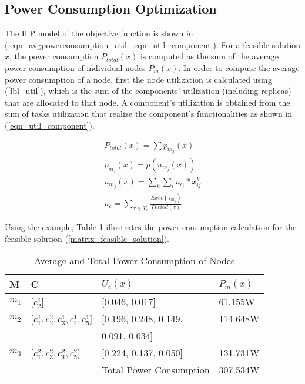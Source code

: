 \subsection{Power Consumption Optimization }
The ILP model of the objective function is shown in (\ref{eqn_avgpowerconsumption_util}-\ref{eqn_util_component}). For a feasible solution $x$, the power consumption $P_{total}(x)$ is computed as the sum of the average power consumption of individual nodes $P_m(x)$. In order to compute the average power consumption of a node, first the node utilization is calculated using (\ref{lbl_util}), which is the sum of the components' utilization (including replicas) that are allocated to that node. A component's utilization is obtained from the sum of tasks utilization that realize the component's functionalities as shown in (\ref{eqn_util_component}).

\begin{align}
\label{eqn_avgpowerconsumption_util}
P_{total}(x) = \sum{p_{m_j}(x)}\\
\label{lbl_power}
p_{m_j}(x) = p(u_{m_j}{(x)})\\
\label{lbl_util}
u_{m_j}{(x)} = \sum_k{\sum_i{u_{c_i}*x^k_{ij}}}\\
\label{eqn_util_component}
u_c = \sum_{\tau\in T_{c}} \frac{Exec(\tau_{m_j})}{Period(\tau)}
\end{align}

Using the example, Table \ref{tbl_powerconsumption} illustrates the power consumption calculation for the feasible solution (\ref{matrix_feasible_solution}).


\begin{table}[h]
\linespread{1.0}\small
\centering
\begin{tabular}{@{}llll@{}}
\toprule
M  & C                             					& $U_c (x)$                                    & $P_m (x)$      \\ \midrule
$m_1$ & {[}$c^1_2${]}                     			& {[}0.046, 0.017{]}                       & 61.155W  \\[0.3em]
$m_2$ & {[}$c^1_1, c^2_2, c^1_3, c^1_4, c^1_5${]} 	& {[}0.196, 0.248, 0.149, & 114.648W \\[0.3em]
		& & 0.091, 0.034{]} &\\[0.3em]
$m_3$ & {[}$c^2_1, c^2_3, c^2_4, c^2_5${]}     		& {[}0.224, 0.137, 0.050{]}                & 131.731W \\[0.3em] \bottomrule
& & Total Power Consumption & 307.534W\\
\end{tabular}
\caption{Average and Total Power Consumption of Nodes}
\label{tbl_powerconsumption}
\end{table}

